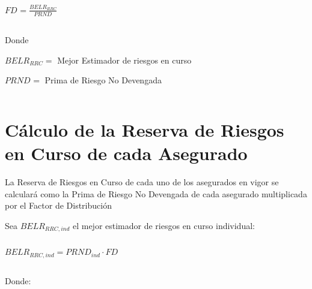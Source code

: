 \documentclass[11pt,twoside,openright,spanish]{report}
\numberwithin{equation}{chapter}
\numberwithin{figure}{chapter}
\numberwithin{table}{chapter}
\begin{document}
 
	
		{\centering
		${FD}_{}^{}=\frac{{BELR}_{RRC}^{}}{{PRND}_{}}$
		\noindent
		
	}	
	
	
	 

$ $

 
	
	Donde
	
	 
	
		$BELR_{RRC}=$ Mejor Estimador de riesgos en curso
		
		$PRND_{}=$ Prima de Riesgo No Devengada
		
	 

$ $

 
	
	\section{Cálculo de la Reserva de Riesgos en Curso de cada Asegurado}
	
	 
	
	La Reserva de Riesgos en Curso de cada uno de los asegurados en vigor se calculará como la Prima de Riesgo No Devengada de cada asegurado multiplicada por el Factor de Distribución \begin{comment} y sumando el $BELG_{ADM,ind}$ así como el Margen de Riesgo prorrateado.
	\end{comment}
	 
	
	Sea $BELR_{RRC,ind}$ el mejor estimador de riesgos en curso individual:
	
	 

$ $

 
	
	{\centering	
	\begin{comment}	
		$
		BELR_{RRC,ind}=\begin{cases}
		PRND_{ind}\cdot FD_{}, & \text{$g \neq Salud Dental Individual$}\\
	
		PTND_{ind}\cdot FS_{BEL}^{RRC}, & \text{$g = Salud Dental Individual$}
		\end{cases}
		$
\end{comment}	

	$BELR_{RRC,ind}=PRND_{ind}\cdot FD_{}$	
		\noindent
		
	}
	
	 

$ $

 
	
	Donde:
	
	 
		
\end{document}
